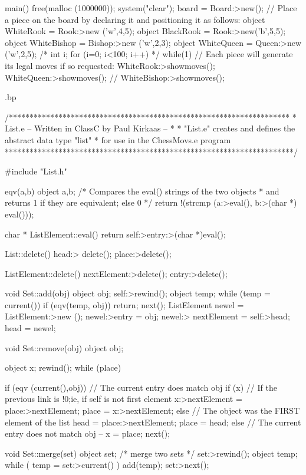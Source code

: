 main()
{
    free(malloc (1000000));
    system("clear");
    board = Board:>new();
    // Place a piece on the board by declaring it and positioning it as follows:
    object WhiteRook = Rook:>new ('w',4,5);
    object BlackRook = Rook:>new('b',5,5);
    object WhiteBishop = Bishop:>new ('w',2,3);
    object WhiteQueen = Queen:>new ('w',2,5);
    /*
    int i;
    for (i=0; i<100; i++)
    */
    while(1)
    {
        // Each piece will generate its legal moves if so requested:
        WhiteRook:>showmoves();
        WhiteQueen:>showmoves();
        // WhiteBishop:>showmoves();
    }
}

.bp



/********************************************************************
 *        List.e -- Written in ClassC by Paul Kirkaas --
 *
 *        "List.e" creates and defines the abstract data type "list"
 *        for use in the ChessMovs.e program
 **********************************************************************/


#include "List.h"

eqv(a,b) object a,b; /* Compares the eval() strings of the two objects
                      * and returns 1 if they are equivalent; else 0 */
{ return !(strcmp (a:>eval(), b:>(char *) eval())); }

char * ListElement::eval() { return self:>entry:>(char *)eval(); }

List::delete()
{
    head:> delete();
    place:>delete();
}

ListElement::delete()
{
    nextElement:>delete();
    entry:>delete();
}


void Set::add(obj) object obj;
{ self:>rewind();
  object temp;
  while (temp = current())
    {
       if (eqv(temp, obj)) return;
       next();
    }
  ListElement newel = ListElement:>new ();
  newel:>entry = obj;
  newel:> nextElement = self:>head;
  head = newel;
}

void Set::remove(obj) object obj;
{
  object x;
  rewind();
  while (place)
  {  if (eqv (current(),obj)) // The current entry does match obj
        { if (x) // If the previous link is !0;ie, if self is not first element
            { x:>nextElement = place:>nextElement;
              place = x:>nextElement;
            }
          else  // The object was the FIRST element of the list
            { head = place:>nextElement;
              place = head;
            }
         }
      else  // The current entry does not match obj --
         { x =  place;
            next();
          }

    }
}
void Set::merge(set) object set; /* merge two sets */
{ set:>rewind();
  object temp;
  while ( temp = set:>current() )
        { add(temp);
          set:>next();
        }
}

